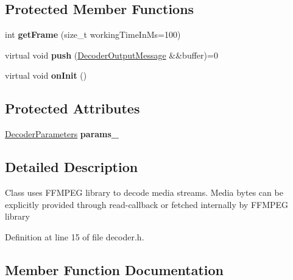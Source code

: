 \subsection*{Protected Member Functions}
\begin{DoxyCompactItemize}
\item 
\mbox{\label{classffmpeg_1_1Decoder_a5183a1bed3d86cc26f613b5771ccfd02}} 
int {\bfseries get\+Frame} (size\+\_\+t working\+Time\+In\+Ms=100)
\item 
\mbox{\label{classffmpeg_1_1Decoder_aa100c64f1b3d4c17ef26a142b8d1bd53}} 
virtual void {\bfseries push} (\hyperlink{structffmpeg_1_1DecoderOutputMessage}{Decoder\+Output\+Message} \&\&buffer)=0
\item 
\mbox{\label{classffmpeg_1_1Decoder_ab44d1b232c21a5a3ba0a83a05560c10c}} 
virtual void {\bfseries on\+Init} ()
\end{DoxyCompactItemize}
\subsection*{Protected Attributes}
\begin{DoxyCompactItemize}
\item 
\mbox{\label{classffmpeg_1_1Decoder_ad53fb0e982cfd3f72be8a44fc6a0ad2c}} 
\hyperlink{structffmpeg_1_1DecoderParameters}{Decoder\+Parameters} {\bfseries params\+\_\+}
\end{DoxyCompactItemize}


\subsection{Detailed Description}
Class uses F\+F\+M\+P\+EG library to decode media streams. Media bytes can be explicitly provided through read-\/callback or fetched internally by F\+F\+M\+P\+EG library 

Definition at line 15 of file decoder.\+h.



\subsection{Member Function Documentation}
\mbox{\label{classffmpeg_1_1Decoder_aceb0e1c21883ccd57c1692fccdd17745}} 

